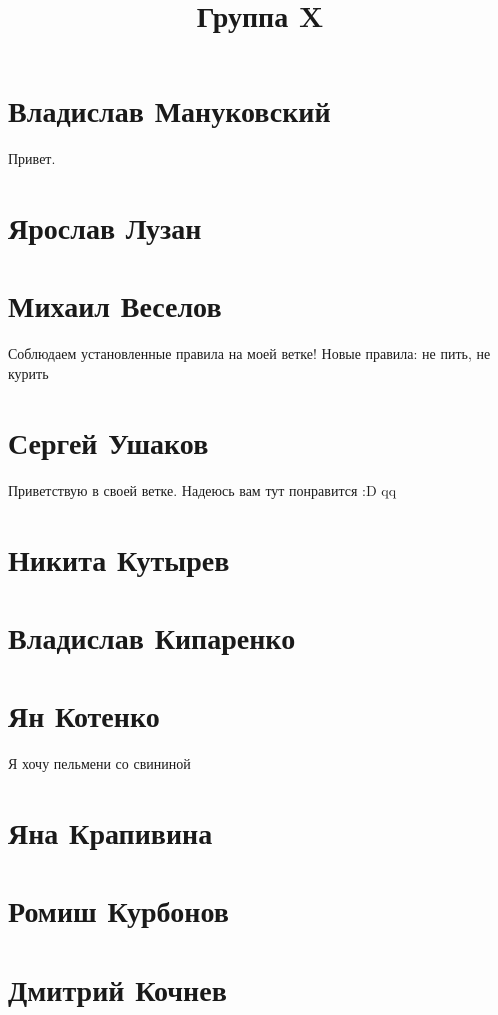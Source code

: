 \documentclass{article}
\title{Группа X}
\begin{document}
\section*{Владислав Мануковский}
Привет.
\section*{Ярослав Лузан}

\section*{Михаил Веселов}

Соблюдаем установленные правила на моей ветке!
Новые правила: не пить, не курить

\section*{Сергей Ушаков}

Приветствую в своей ветке. Надеюсь вам тут понравится :D qq

\section*{Никита Кутырев}

\section*{Владислав Кипаренко}

\section*{Ян Котенко}
Я хочу пельмени со свининой
\section*{Яна Крапивина}

\section*{Ромиш Курбонов}

\section*{Дмитрий Кочнев}
\end{document}
